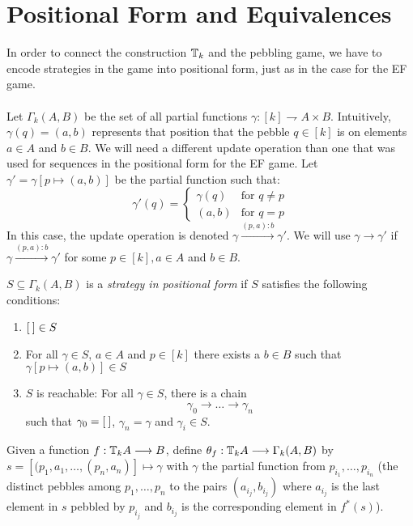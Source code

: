 \section{Positional Form and Equivalences}\label{sec:positionalFormP}
In order to connect the construction ${\mathbb{T}_{k}}$ and the pebbling game, we have to encode strategies in the game into positional form, just as in the case for the EF game. \\~\\
Let $\Gamma_{k}(A,B)$ be the set of all partial functions $\gamma:[k] \rightharpoondown A \times B$. Intuitively, $\gamma(q) = (a,b)$ represents that position that the pebble $q \in [k]$ is on elements $a \in A$ and $b \in B$. We will need a different update operation than one that was used for sequences in the positional form for the EF game. Let $\gamma' = \gamma[p \mapsto (a,b)]$ be the partial function such that:  
\begin{equation*}
\gamma'(q) = \begin{cases}
                \gamma(q) & \text{for } q \not= p \\
                (a,b) & \text{for } q = p 
            \end{cases}
\end{equation*}
In this case, the update operation is denoted $\gamma \xrightarrow{(p,a):b} \gamma'$. We will use $\gamma \longrightarrow \gamma'$ if $\gamma \xrightarrow{(p,a):b} \gamma'$ for some $p \in [k], a \in A$ and $b \in B$.
\begin{defn}
$S \subseteq \Gamma_{k}(A,B)$ is a \textit{strategy in positional form} if $S$ satisfies the following conditions:
\begin{enumerate}[label=(S\arabic*),ref=S\arabic*,start=0]
\item ${[\:]} \in S$ \label{eq:S1st}
\item For all $\gamma \in S$, $a \in A$ and $p \in [k]$ there exists a $b \in B$ such that $\gamma[p \mapsto (a,b)] \in S$ \label{eq:S2nd}
\item $S$ is reachable: For all $\gamma \in S$, there is a chain \label{eq:S3rd}
$$\gamma_{0} \longrightarrow \dots \longrightarrow \gamma_{n}$$
such that $\gamma_{0} = {[\:]}$, $\gamma_{n} = \gamma$ and $\gamma_{i} \in S$. 
\end{enumerate}
\end{defn}
Given a function $f:{\mathbb{T}_{k}A} \longrightarrow B$, define $\theta_{f}:{\mathbb{T}_{k}A} \longrightarrow \Gamma_{k}(A,B)$ by $s = [(p_{1},a_{1},\dots,(p_{n},a_{n})] \mapsto \gamma$ with $\gamma$ the partial function from $p_{i_{1}},\dots,p_{i_{n}}$ (the distinct pebbles among $p_{1},\dots,p_{n}$ to the pairs $(a_{i_{j}},b_{i_{j}})$ where $a_{i_{j}}$ is the last element in $s$ pebbled by $p_{i_{j}}$ and $b_{i_{j}}$ is the corresponding element in $f^{*}(s)$). 
